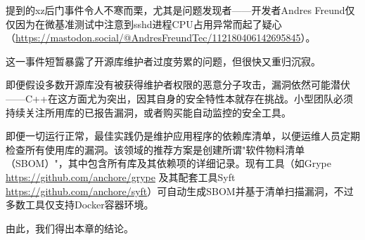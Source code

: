 提到的xz后门事件令人不寒而栗，尤其是问题发现者——开发者Andres Freund仅仅因为在微基准测试中注意到sshd进程CPU占用异常而起了疑心（\url{https://mastodon.social/@AndresFreundTec/112180406142695845}）。

这一事件短暂暴露了开源库维护者过度劳累的问题，但很快又重归沉寂。

即便假设多数开源库没有被获得维护者权限的恶意分子攻击，漏洞依然可能潜伏——C++在这方面尤为突出，因其自身的安全特性本就存在挑战。小型团队必须持续关注所用库的已报告漏洞，或者购买能自动监控的安全工具。

即便一切运行正常，最佳实践仍是维护应用程序的依赖库清单，以便运维人员定期检查所有使用库的漏洞。该领域的推荐方案是创建所谓"软件物料清单（SBOM）"，其中包含所有库及其依赖项的详细记录。现有工具（如Grype \url{https://github.com/anchore/grype} 及其配套工具Syft \url{https://github.com/anchore/syft}）可自动生成SBOM并基于清单扫描漏洞，不过多数工具仅支持Docker容器环境。

由此，我们得出本章的结论。







